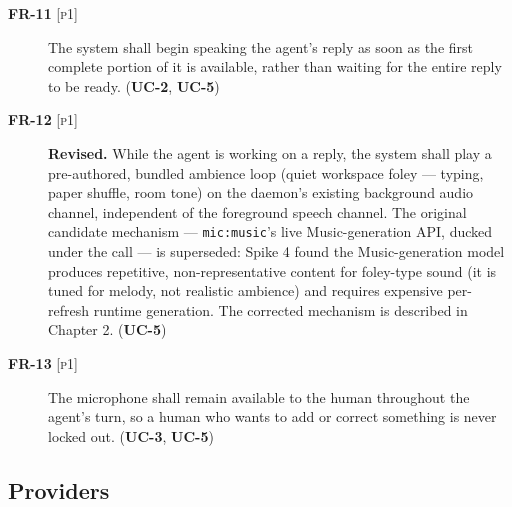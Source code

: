 \documentclass[a4paper,11pt]{report}
\newcommand{\uc}[1]{\textbf{UC-#1}}
\newcommand{\fr}[1]{\textbf{FR-#1}}
\newcommand{\pone}{\textsc{[p1]}}
\begin{document}
\begin{description}
  \item[\fr{11} \pone{}] The system shall begin speaking the agent's reply
    as soon as the first complete portion of it is available, rather than
    waiting for the entire reply to be ready. (\uc{2}, \uc{5})
  \item[\fr{12} \pone{}] \textbf{Revised.} While the agent is working on a
    reply, the system shall play a pre-authored, bundled ambience loop
    (quiet workspace foley --- typing, paper shuffle, room tone) on the
    daemon's existing background audio channel, independent of the
    foreground speech channel. The original candidate mechanism ---
    \texttt{mic:music}'s live Music-generation API, ducked under the call
    --- is superseded: Spike 4 found the Music-generation model produces
    repetitive, non-representative content for foley-type sound (it is
    tuned for melody, not realistic ambience) and requires expensive
    per-refresh runtime generation. The corrected mechanism is described
    in Chapter 2. (\uc{5})
  \item[\fr{13} \pone{}] The microphone shall remain available to the
    human throughout the agent's turn, so a human who wants to add or
    correct something is never locked out. (\uc{3}, \uc{5})
\end{description}

\subsection{Providers}
\end{document}
